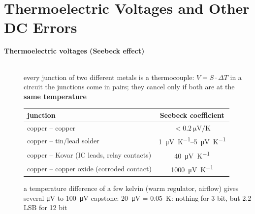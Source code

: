\section{Thermoelectric Voltages and Other DC Errors}

\begin{description}
\item[{\rot\bf Thermoelectric voltages (Seebeck effect)}]~\\[-\lblskip]
\bi
	\ite every junction of two different metals is a thermocouple: $V = S\cdot\Delta T$
	\ite in a circuit the junctions come in pairs; they cancel only if both are at the \textbf{same temperature}
\ei
\begin{center}
\begin{tabular}{lc}
\toprule
junction & Seebeck coefficient \\
\midrule
copper -- copper & $<\SI{0.2}{\micro\volt\per\kelvin}$ \\
copper -- tin/lead solder & \SIrange{1}{5}{\micro\volt\per\kelvin} \\
copper -- Kovar (IC leads, relay contacts) & \SI{40}{\micro\volt\per\kelvin} \\
copper -- copper oxide (corroded contact) & \SI{1000}{\micro\volt\per\kelvin} \\
\bottomrule
\end{tabular}
\end{center}
\bi
	\ite a temperature difference of a few kelvin (warm regulator, airflow) gives several \si{\micro\volt} to \SI{100}{\micro\volt}
	\ite capstone: \SI{20}{\micro\volt} = \SI{0.05}{\kelvin}: nothing for 3 bit, but 2.2 LSB for 12 bit
\ei
\os{\newpage}


\end{description}
